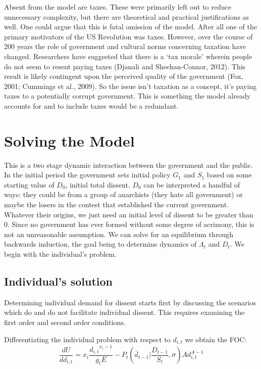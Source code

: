 \documentclass[12pt]{article}
\begin{document}
\begin{spacing}{1.5}
Absent from the model are taxes. These were primarily left out to reduce unnecessary complexity, but there are theoretical and practical justifications as well. One could argue that this is fatal omission of the model. After all one of the primary motivators of the US Revolution was taxes. However, over the course of 200 years the role of government and cultural norms concerning taxation have changed. Researchers have suggested that there is a `tax morale' wherein people do not seem to resent paying taxes (Djanali and Sheehan-Connor, 2012). This result is likely contingent upon the perceived quality of the government (Fox, 2001; Cummings et al., 2009). So the issue isn't taxation as a concept, it's paying taxes to a potentially corrupt government. This is something the model already accounts for and to include taxes would be a redundant.  


  
 
\section{Solving the Model}

This is a two stage dynamic interaction between the government and the public. In the initial period the government sets initial policy $G_1$ and $S_1$ based on some starting value of $D_0$, initial total dissent. $D_0$ can be interpreted a handful of ways: they could be from a group of anarchists (they hate all government) or maybe the losers in the contest that established the current government. Whatever their origins, we just need an initial level of dissent to be greater than 0. Since no government has ever formed without some degree of acrimony, this is not an unreasonable assumption. We can solve for an equilibrium through backwards induction, the goal being to determine dynamics of $\Lambda_t$ and $D_t$. We begin with the individual's problem. 

 
\subsection{Individual's solution}

Determining individual demand for dissent starts first by discussing the scenarios which do and do not facilitate individual dissent. This requires examining the first order and second order conditions. 
 
\vspace{.5 em}
\noindent Differentiating the individual problem with respect to $d_{i,t}$ we obtain the FOC: 
\begin{equation}
\frac{dU}{dd_{i,t}} = x_i \frac{{d_{i,t}}^{x_i -1}}{g_t E} - P_t \left(\bar{d}_{t-1} \Big|\frac{D_{t-1}}{S_t},\sigma \right)Ad_{i,t}^{A-1}  
\end{equation}


\end{spacing}
\end{document}
